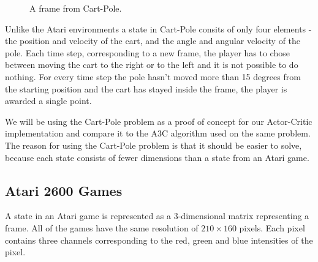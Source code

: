 \documentclass[11pt]{article}
\begin{document}
\begin{figure}[!h]
    \centering
    \caption{A frame from Cart-Pole.}
    \label{fig:cartpole}
\end{figure}

Unlike the Atari environments a state in Cart-Pole consits of only four elements - the position and velocity of the cart, and the
angle and angular velocity of the pole.
Each time step, corresponding to a new frame, the player has to chose between moving the cart to the right or to the left and it is not possible
to do nothing.
For every time step the pole hasn't moved more than 15 degrees from the starting position and
the cart has stayed inside the frame, the player is awarded a single point.

We will be using the Cart-Pole problem as a proof of concept for our Actor-Critic implementation and
compare it to the A3C algorithm used on the same problem.
The reason for using the Cart-Pole problem is that it should be easier
to solve, because each state consists of fewer dimensions than a state
from an Atari game.


\subsection{Atari 2600 Games}\label{sec:atari}

A state in an Atari game is represented as a 3-dimensional matrix representing a
frame.
All of the games have the same resolution of $210 \times 160$ pixels.
Each pixel contains three channels corresponding to the red, green and blue intensities of the pixel.
\end{document}
